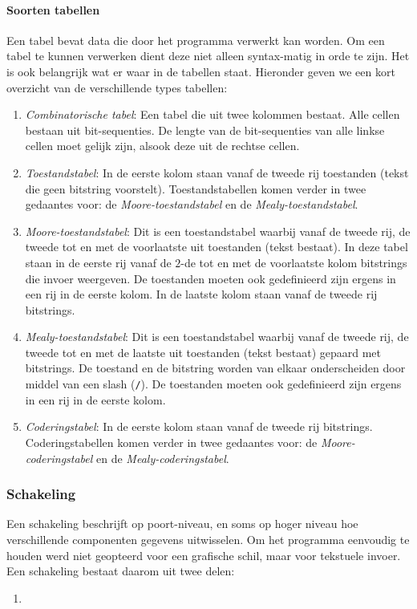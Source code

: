 \paragraph{Soorten tabellen}
Een tabel bevat data die door het programma verwerkt kan worden. Om een tabel te kunnen verwerken dient deze niet alleen syntax-matig in orde te zijn. Het is ook belangrijk wat er waar in de tabellen staat. Hieronder geven we een kort overzicht van de verschillende types tabellen:
\begin{enumerate}
 \item \emph{Combinatorische tabel}: Een tabel die uit twee kolommen bestaat. Alle cellen bestaan uit bit-sequenties. De lengte van de bit-sequenties van alle linkse cellen moet gelijk zijn, alsook deze uit de rechtse cellen.
 \item \emph{Toestandstabel}: In de eerste kolom staan vanaf de tweede rij toestanden (tekst die geen bitstring voorstelt). Toestandstabellen komen verder in twee gedaantes voor: de \emph{Moore-toestandstabel} en de \emph{Mealy-toestandstabel}.
 \item \emph{Moore-toestandstabel}: Dit is een toestandstabel waarbij vanaf de tweede rij, de tweede tot en met de voorlaatste uit toestanden (tekst bestaat). In deze tabel staan in de eerste rij vanaf de $2$-de tot en met de voorlaatste kolom bitstrings die invoer weergeven. De toestanden moeten ook gedefinieerd zijn ergens in een rij in de eerste kolom. In de laatste kolom staan vanaf de tweede rij bitstrings.
 \item \emph{Mealy-toestandstabel}: Dit is een toestandstabel waarbij vanaf de tweede rij, de tweede tot en met de laatste uit toestanden (tekst bestaat) gepaard met bitstrings. De toestand en de bitstring worden van elkaar onderscheiden door middel van een slash (\texttt{/}). De toestanden moeten ook gedefinieerd zijn ergens in een rij in de eerste kolom.
 \item \emph{Coderingstabel}: In de eerste kolom staan vanaf de tweede rij bitstrings. Coderingstabellen komen verder in twee gedaantes voor: de \emph{Moore-coderingstabel} en de \emph{Mealy-coderingstabel}.
\end{enumerate}
\subsubsection{Schakeling}
Een schakeling beschrijft op poort-niveau, en soms op hoger niveau hoe verschillende componenten gegevens uitwisselen. Om het programma eenvoudig te houden werd niet geopteerd voor een grafische schil, maar voor tekstuele invoer. Een schakeling bestaat daarom uit twee delen:
\begin{enumerate}
 \item 
\end{enumerate}
